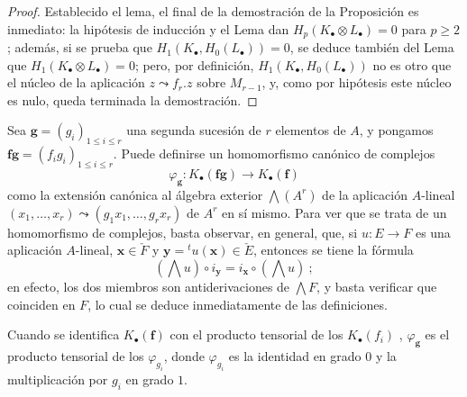 \begin{proof}
Establecido el lema, el final de la demostración de la Proposición  es inmediato: la hipótesis de inducción y el Lema  dan $H_p(K_\bullet\otimes L_\bullet)=0$ para $p\geq2$; además, si se prueba que $H_1(K_\bullet,H_0(L_\bullet))=0$, se deduce también del Lema  que $H_1(K_\bullet\otimes L_\bullet)=0$; pero, por definición, $H_1(K_\bullet,H_0(L_\bullet))$ no es otro que el núcleo de la aplicación $z\leadsto f_r.z$ sobre $M_{r-1}$, y, como por hipótesis este núcleo es nulo, queda terminada la demostración.
\end{proof}

\begin{env}[1.1.5]
\label{III.1.1.5}
\label{III.1.1.5-fr}
Sea $\mathbf g=(g_i)_{1\leq i\leq r}$ una segunda sucesión de $r$ elementos de $A$, y pongamos $\mathbf f\mathbf g=(f_ig_i)_{1\leq i\leq r}$.
Puede definirse un homomorfismo canónico de complejos
\begin{equation}
\label{III.1.1.5.1-fr}
\tag{1.1.5.1}
\varphi_{\mathbf g}:K_\bullet(\mathbf f\mathbf g)\longrightarrow
K_\bullet(\mathbf f)
\end{equation}
como la extensión canónica al álgebra exterior $\bigwedge(A^r)$ de la aplicación $A$-lineal $(x_1,\ldots,x_r)\leadsto(g_1x_1,\ldots,g_rx_r)$ de $A^r$ en sí mismo.
Para ver que se trata de un homomorfismo de complejos, basta observar, en general, que, si $u:E\to F$ es una aplicación $A$-lineal, $\mathbf x\in\check F$ y $\mathbf y={}^tu(\mathbf x)\in\check E$, entonces se tiene la fórmula
\begin{equation}
\label{III.1.1.5.2-fr}
\tag{1.1.5.2}
(\bigwedge u)\circ i_{\mathbf y}=i_{\mathbf x}\circ(\bigwedge u)~;
\end{equation}
en efecto, los dos miembros son antiderivaciones de $\bigwedge F$, y basta verificar que coinciden en $F$, lo cual se deduce inmediatamente de las definiciones.

Cuando se identifica $K_\bullet(\mathbf f)$ con el producto tensorial de los $K_\bullet(f_i)$ , $\varphi_{\mathbf g}$ es el producto tensorial de los $\varphi_{g_i}$, donde $\varphi_{g_i}$ es la identidad en grado $0$ y la multiplicación por $g_i$ en grado $1$.
\end{env}

